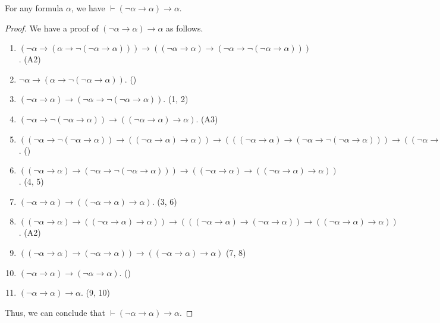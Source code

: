 \begin{theorem}
  \label{thm:clavius}
  For any formula $\alpha$, we have $\vdash (\neg\alpha \to \alpha) \to
  \alpha$.
\end{theorem}
\begin{proof}
  We have a proof of $(\neg\alpha \to \alpha) \to \alpha$ as follows.
  \begin{enumerate}[(1)]
    \item $(\neg\alpha \to (\alpha \to \neg(\neg\alpha \to \alpha))) \to
    ((\neg\alpha \to \alpha) \to (\neg\alpha \to \neg(\neg\alpha \to
    \alpha)))$. \hfill (A2)
    \item $\neg\alpha \to (\alpha \to \neg(\neg\alpha \to \alpha))$.
    \hfill ()
    \item $(\neg\alpha \to \alpha) \to (\neg\alpha \to \neg(\neg\alpha \to
    \alpha))$. \hfill (1, 2)
    \item $(\neg\alpha \to \neg(\neg\alpha \to \alpha)) \to ((\neg\alpha \to
    \alpha) \to \alpha)$. \hfill (A3)
    \item $((\neg\alpha \to \neg(\neg\alpha \to \alpha)) \to ((\neg\alpha \to
    \alpha) \to \alpha)) \to (((\neg\alpha \to \alpha) \to (\neg\alpha \to
    \neg(\neg\alpha \to \alpha))) \to ((\neg\alpha \to \alpha) \to ((\neg\alpha
    \to \alpha) \to \alpha)))$. \hfill ()
    \item $((\neg\alpha \to \alpha) \to (\neg\alpha \to \neg(\neg\alpha \to
    \alpha))) \to ((\neg\alpha \to \alpha) \to ((\neg\alpha \to \alpha) \to
    \alpha))$. \hfill (4, 5)
    \item $(\neg\alpha \to \alpha) \to ((\neg\alpha \to \alpha) \to \alpha)$.
    \hfill (3, 6)
    \item $((\neg\alpha \to \alpha) \to ((\neg\alpha \to \alpha) \to \alpha))
    \to (((\neg\alpha \to \alpha) \to (\neg\alpha \to \alpha)) \to
    ((\neg\alpha \to \alpha) \to \alpha))$. \hfill (A2)
    \item $((\neg\alpha \to \alpha) \to (\neg\alpha \to \alpha)) \to
    ((\neg\alpha \to \alpha) \to \alpha)$ \hfill (7, 8)
    \item $(\neg\alpha \to \alpha) \to (\neg\alpha \to \alpha)$.
    \hfill ()
    \item $(\neg\alpha \to \alpha) \to \alpha$. \hfill (9, 10)
  \end{enumerate}
  Thus, we can conclude that $\vdash (\neg\alpha \to \alpha) \to \alpha$.
\end{proof}

